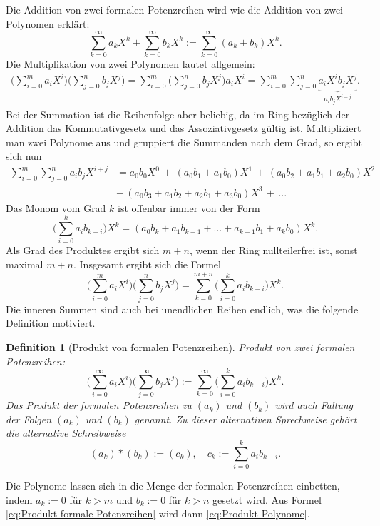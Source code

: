 \documentclass[a4paper,11pt,fleqn,twoside]{scrartcl}
\numberwithin{equation}{section}
\theoremstyle{rmbox}
\newtheorem{Definition}{Definition}
\newcommand{\emdef}[1]{\emph{#1}}
\begin{document}
Die Addition von zwei formalen Potenzreihen wird
wie die Addition von zwei Polynomen erklärt:
\begin{equation}\label{eq:Addition-formale-Potenzreihen}
\sum_{k=0}^\infty a_k X^k + \sum_{k=0}^\infty b_k X^k
:= \sum_{k=0}^\infty (a_k+b_k)X^k.
\end{equation}
Die Multiplikation von zwei Polynomen lautet allgemein:
\begin{align}
\bigg(\sum_{i=0}^m a_i X^i\bigg)\bigg(\sum_{j=0}^n b_j X^j\bigg)
= \sum_{i=0}^m \bigg(\sum_{j=0}^n b_j X^j\bigg) a_i X^i
= \sum_{i=0}^m \sum_{j=0}^n \underbrace{a_i X^i b_j X^j}_{\displaystyle a_ib_j X^{i+j}}.
\end{align}
Bei der Summation ist die Reihenfolge aber beliebig, da im Ring
bezüglich der Addition das Kommutativgesetz und das Assoziativgesetz
gültig ist. Multipliziert man zwei Polynome aus und gruppiert
die Summanden nach dem Grad, so ergibt sich nun
\begin{equation}
\begin{split}
\sum_{i=0}^m \sum_{j=0}^n a_ib_j X^{i+j}
&= a_0 b_0 X^0 \,+\, (a_0 b_1 + a_1 b_0) X^1\,+\,
(a_0 b_2 + a_1 b_1 + a_2 b_0) X^2\\
&+\,(a_0 b_3 + a_1 b_2 + a_2 b_1 + a_3 b_0) X^3\,+\,\ldots
\end{split}
\end{equation}
Das Monom vom Grad $k$ ist offenbar immer von der Form
\begin{equation}
\bigg(\sum_{i=0}^k a_i b_{k-i}\bigg) X^k
= (a_0 b_k + a_1 b_{k-1} + \ldots + a_{k-1} b_1 + a_k b_0) X^k.
\end{equation}
Als Grad des Produktes ergibt sich $m+n$, wenn der Ring
nullteilerfrei ist, sonst maximal $m+n$. Insgesamt ergibt sich
die Formel
\begin{equation}\label{eq:Produkt-Polynome}
\bigg(\sum_{i=0}^m a_i X^i\bigg)\bigg(\sum_{j=0}^n b_j X^j\bigg)
= \sum_{k=0}^{m+n}\bigg(\sum_{i=0}^k a_i b_{k-i}\bigg) X^k.
\end{equation}
Die inneren Summen sind auch bei unendlichen Reihen endlich, was
die folgende Definition motiviert.

\begin{Definition}[Produkt von formalen Potenzreihen]
\emdef{Produkt} von zwei formalen Potenzreihen:
\begin{equation}\label{eq:Produkt-formale-Potenzreihen}
\bigg(\sum_{i=0}^\infty a_i X^i\bigg)\bigg(\sum_{j=0}^\infty b_j X^j\bigg)
:= \sum_{k=0}^\infty\bigg(\sum_{i=0}^k a_i b_{k-i}\bigg) X^k.
\end{equation}
Das Produkt der formalen Potenzreihen zu $(a_k)$ und $(b_k)$ wird
auch \emdef{Faltung} der Folgen $(a_k)$ und $(b_k)$ genannt.
Zu dieser alternativen Sprechweise gehört die alternative
Schreibweise%
\begin{equation}
(a_k)\ast (b_k) := (c_k),\quad c_k:=\sum_{i=0}^k a_i b_{k-i}.
\end{equation}
\end{Definition}
\noindent
Die Polynome lassen sich in die Menge der formalen Potenzreihen
einbetten, indem $a_k:=0$ für $k>m$ und $b_k:=0$ für $k>n$
gesetzt wird. Aus Formel \eqref{eq:Produkt-formale-Potenzreihen}
wird dann \eqref{eq:Produkt-Polynome}.
\end{document}
